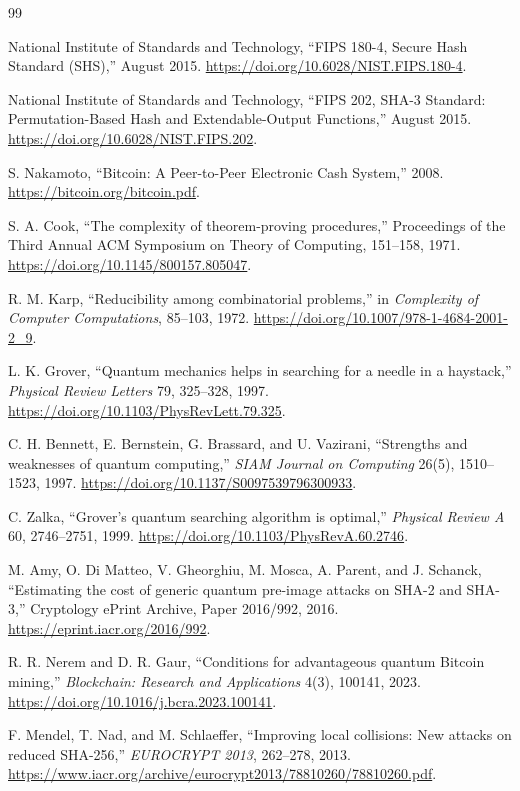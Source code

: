 \documentclass[11pt]{article}
\theoremstyle{definition}
\theoremstyle{remark}
\begin{document}
\begin{thebibliography}{99}

National Institute of Standards and Technology,
``FIPS 180-4, Secure Hash Standard (SHS),''
August 2015. \url{https://doi.org/10.6028/NIST.FIPS.180-4}.

National Institute of Standards and Technology,
``FIPS 202, SHA-3 Standard: Permutation-Based Hash and Extendable-Output
Functions,'' August 2015.
\url{https://doi.org/10.6028/NIST.FIPS.202}.

S. Nakamoto,
``Bitcoin: A Peer-to-Peer Electronic Cash System,''
2008. \url{https://bitcoin.org/bitcoin.pdf}.

S. A. Cook,
``The complexity of theorem-proving procedures,''
Proceedings of the Third Annual ACM Symposium on Theory of Computing,
151--158, 1971. \url{https://doi.org/10.1145/800157.805047}.

R. M. Karp,
``Reducibility among combinatorial problems,''
in \emph{Complexity of Computer Computations}, 85--103, 1972.
\url{https://doi.org/10.1007/978-1-4684-2001-2_9}.

L. K. Grover,
``Quantum mechanics helps in searching for a needle in a haystack,''
\emph{Physical Review Letters} 79, 325--328, 1997.
\url{https://doi.org/10.1103/PhysRevLett.79.325}.

C. H. Bennett, E. Bernstein, G. Brassard, and U. Vazirani,
``Strengths and weaknesses of quantum computing,''
\emph{SIAM Journal on Computing} 26(5), 1510--1523, 1997.
\url{https://doi.org/10.1137/S0097539796300933}.

C. Zalka,
``Grover's quantum searching algorithm is optimal,''
\emph{Physical Review A} 60, 2746--2751, 1999.
\url{https://doi.org/10.1103/PhysRevA.60.2746}.

M. Amy, O. Di Matteo, V. Gheorghiu, M. Mosca, A. Parent, and J. Schanck,
``Estimating the cost of generic quantum pre-image attacks on SHA-2 and
SHA-3,'' Cryptology ePrint Archive, Paper 2016/992, 2016.
\url{https://eprint.iacr.org/2016/992}.

R. R. Nerem and D. R. Gaur,
``Conditions for advantageous quantum Bitcoin mining,''
\emph{Blockchain: Research and Applications} 4(3), 100141, 2023.
\url{https://doi.org/10.1016/j.bcra.2023.100141}.

F. Mendel, T. Nad, and M. Schlaeffer,
``Improving local collisions: New attacks on reduced SHA-256,''
\emph{EUROCRYPT 2013}, 262--278, 2013.
\url{https://www.iacr.org/archive/eurocrypt2013/78810260/78810260.pdf}.


\end{thebibliography}
\end{document}
